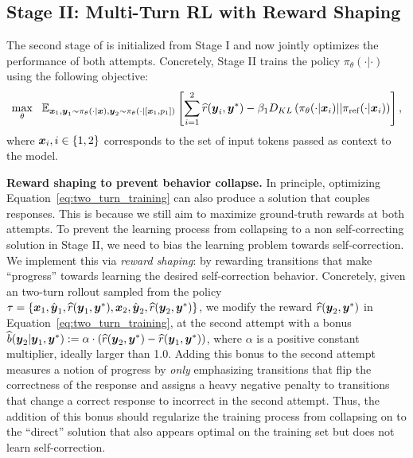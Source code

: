 \vspace{-0.2cm}
\subsection{Stage II: Multi-Turn RL with Reward Shaping}
\vspace{-0.2cm}
The second stage of \methodname{} is initialized from Stage I and now jointly optimizes the performance of both attempts. Concretely, Stage II trains the policy $\pi_\theta(\cdot|\cdot)$ using the following objective:
\begin{align}
    \label{eq:two_turn_training}
    \max_{\theta}~~ \mathbb{E}_{\boldsymbol{x}_1, \boldsymbol{y}_1 \sim \pi_{\theta}(\cdot | \boldsymbol{x}), \boldsymbol{y}_2 \sim \pi_\theta(\cdot|[\boldsymbol{x}_1, p_1]) }\left[\sum_{i=1}^2 \widehat{r}(\boldsymbol{y}_i, \boldsymbol{y}^*) - \beta_1 D_{KL}\left(\pi_{\theta}(\cdot | \boldsymbol{x}_i) || \pi_\mathrm{ref}(\cdot | \boldsymbol{x}_i)\right) \right],
\end{align}
where $\boldsymbol{x}_i, i \in \{1, 2\}$ corresponds to the set of input tokens passed as context to the model. %

\textbf{Reward shaping to prevent behavior collapse.} In principle, optimizing Equation~\ref{eq:two_turn_training} can also produce a solution that couples responses. This is because we still aim to maximize ground-truth rewards at both attempts. To prevent the learning process from collapsing to a non self-correcting solution in Stage II, we need to bias the learning problem towards self-correction. We implement this via \emph{reward shaping}: by rewarding transitions that make ``progress'' towards learning the desired self-correction behavior. Concretely, given an two-turn rollout sampled from the policy $\tau = \{\boldsymbol{x}_1, \hat{\boldsymbol{y}}_1, \widehat{r}(\boldsymbol{y}_1, \boldsymbol{y}^*), \boldsymbol{x}_2, \hat{\boldsymbol{y}}_2, \widehat{r}(\boldsymbol{y}_2, \boldsymbol{y}^*) \}$, we modify the reward $\widehat{r}(\boldsymbol{y}_2, \boldsymbol{y}^*)$ in Equation~\ref{eq:two_turn_training}, at the second attempt with a bonus $\widehat{b}(\boldsymbol{y}_2 | \boldsymbol{y}_1, \boldsymbol{y}^*) := \alpha \cdot \left(\widehat{r}(\boldsymbol{y}_2, \boldsymbol{y}^*) - \widehat{r}(\boldsymbol{y}_1, \boldsymbol{y}^*) \right)$,
where $\alpha$ is a positive constant multiplier, ideally larger than 1.0. Adding this bonus to the second attempt measures a notion of progress by \emph{only} emphasizing transitions that flip the correctness of the response and assigns a heavy negative penalty to transitions that change a correct response to incorrect in the second attempt. Thus, the addition of this bonus should regularize the training process from collapsing on to the ``direct'' solution that also appears optimal on the training set but does not learn self-correction.


